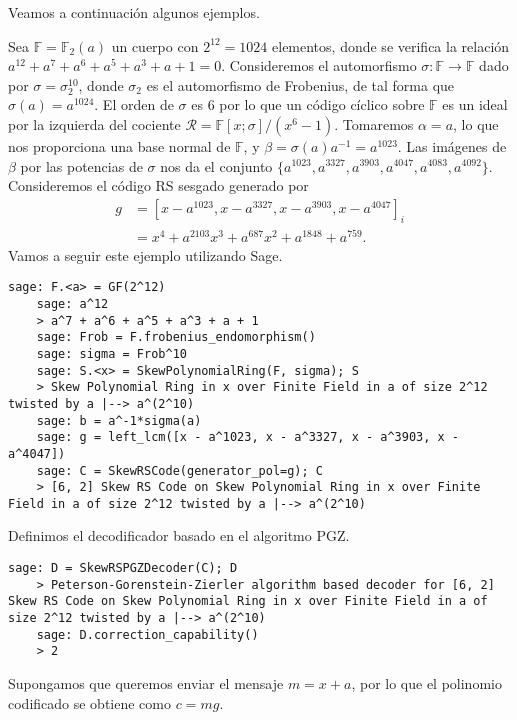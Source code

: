 Veamos a continuación algunos ejemplos.

\begin{example}
  Sea \(\mathbb F = \mathbb F_2(a)\) un cuerpo con \(2^{12} = 1024\) elementos, donde se verifica la relación \(a^{12} + a^7 + a^{6} + a^{5} + a^{3} + a + 1 = 0\).
  Consideremos el automorfismo \(\sigma: \mathbb F \to \mathbb F\) dado por \(\sigma = \sigma_2^{10}\), donde \(\sigma_2\) es el automorfismo de Frobenius, de tal forma que \(\sigma(a) = a^{1024}\).
  El orden de \(\sigma\) es \(6\) por lo que un código cíclico sobre \(\mathbb F\) es un ideal por la izquierda del cociente \(\mathcal R = \mathbb F[x; \sigma]/(x^{6} - 1)\).
  Tomaremos \(\alpha = a\), lo que nos proporciona una base normal de \(\mathbb F\), y \(\beta = \sigma(a)a^{-1} = a^{1023}\).
  Las imágenes de \(\beta\) por las potencias de \(\sigma\) nos da el conjunto \(\{a^{1023}, a^{3327}, a^{3903}, a^{4047}, a^{4083}, a^{4092}\}\).
  Consideremos el código RS sesgado generado por
  \begin{align*}
    g &= \left[x - a^{1023}, x - a^{3327}, x - a^{3903}, x - a^{4047}\right]_i \\
      &= x^4 + a^{2103}x^3 + a^{687}x^2 + a^{1848} + a^{759}.
  \end{align*}
  Vamos a seguir este ejemplo utilizando Sage.
  \begin{lstlisting}[gobble=4]
    sage: F.<a> = GF(2^12)
    sage: a^12
    > a^7 + a^6 + a^5 + a^3 + a + 1
    sage: Frob = F.frobenius_endomorphism()
    sage: sigma = Frob^10
    sage: S.<x> = SkewPolynomialRing(F, sigma); S
    > Skew Polynomial Ring in x over Finite Field in a of size 2^12 twisted by a |--> a^(2^10)
    sage: b = a^-1*sigma(a)
    sage: g = left_lcm([x - a^1023, x - a^3327, x - a^3903, x - a^4047])
    sage: C = SkewRSCode(generator_pol=g); C
    > [6, 2] Skew RS Code on Skew Polynomial Ring in x over Finite Field in a of size 2^12 twisted by a |--> a^(2^10)
  \end{lstlisting}
  Definimos el decodificador basado en el algoritmo PGZ.
  \begin{lstlisting}[gobble=4]
    sage: D = SkewRSPGZDecoder(C); D
    > Peterson-Gorenstein-Zierler algorithm based decoder for [6, 2] Skew RS Code on Skew Polynomial Ring in x over Finite Field in a of size 2^12 twisted by a |--> a^(2^10)
    sage: D.correction_capability()
    > 2
  \end{lstlisting}
  Supongamos que queremos enviar el mensaje \(m = x + a\), por lo que el polinomio codificado se obtiene como \(c = mg\).
  \begin{lstlisting}[gobble=4]

\end{lstlisting}
\end{example}
